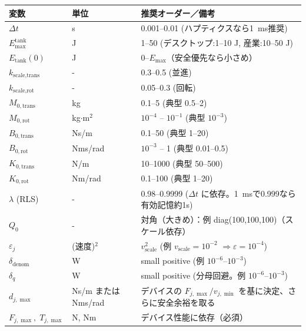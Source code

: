 \documentclass[uplatex]{jsarticle}
\begin{document}
\begin{table}[h]
  \centering
  \begin{tabular}{l l l}
  \toprule
  変数 & 単位 & 推奨オーダー／備考 \\
  \midrule
  $\Delta t$ & s & 0.001--0.01 (ハプティクスなら1~\si{ms}推奨) \\
  $E_{\max}^{\text{tank}}$ & J & 1--50 (デスクトップ:1--10 \si{J}, 産業:10--50 \si{J}) \\
  $E_{\text{tank}}(0)$ & J & 0--$E_{\max}$（安全優先なら小さめ） \\
  $k_{\text{scale,trans}}$ & - & 0.3--0.5 (並進) \\
  $k_{\text{scale,rot}}$ & - & 0.05--0.3 (回転) \\
  $M_{0,\text{trans}}$ & kg & 0.1--5 (典型 0.5--2) \\
  $M_{0,\text{rot}}$ & kg$\cdot$m$^2$ & $10^{-4}$ -- $10^{-1}$ (典型 $10^{-3}$) \\
  $B_{0,\text{trans}}$ & Ns/m & 0.1--50 (典型 1--20) \\
  $B_{0,\text{rot}}$ & Nms/rad & $10^{-3}$ -- 1 (典型 0.01--0.5) \\
  $K_{0,\text{trans}}$ & N/m & 10--1000 (典型 50--500) \\
  $K_{0,\text{rot}}$ & Nm/rad & 0.1--100 (典型 1--20) \\
  $\lambda$ (RLS) & - & 0.98--0.9999 ($\Delta t$ に依存。1~\si{ms}で0.999なら有効記憶約1s) \\
  $Q_0$ & - & 対角（大きめ）：例 diag(100,100,100)（スケール依存） \\
  $\varepsilon_j$ & (速度)$^2$ & $v_{\text{scale}}^2$ (例 $v_{\text{scale}}=10^{-2}$ $\Rightarrow \varepsilon=10^{-4}$) \\
  $\delta_{\text{denom}}$ & W & small positive (例 $10^{-6}$--$10^{-3}$) \\
  $\delta_q$ & W & small positive (分母回避。例 $10^{-6}$--$10^{-3}$) \\
  $d_{j,\max}$ & Ns/m または Nms/rad & デバイスの $F_{j,\max}/v_{j,\min}$ を基に決定、さらに安全余裕を取る \\
  $F_{j,\max},\;T_{j,\max}$ & N, Nm & デバイス性能に依存（必須） \\
  \bottomrule
  \end{tabular}
\end{table}
\end{document}
